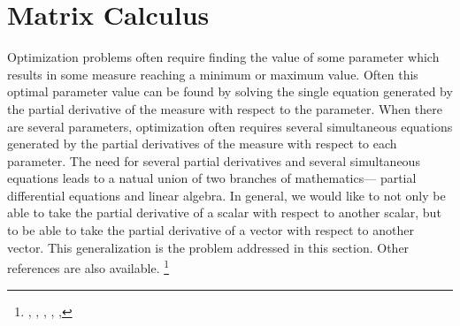 
\chapter{Matrix Calculus}
\label{app:mc}

Optimization problems often require finding the value of some parameter
which results in some measure reaching a minimum or maximum value.
Often this optimal parameter value can be found by
solving the single equation generated by the
partial derivative of the measure with respect to the parameter.
When there are several parameters,
optimization often requires several simultaneous equations
generated by the
partial derivatives of the measure with respect to each parameter.
The need for several partial derivatives and several simultaneous
equations leads to a natual union of two branches of mathematics---
partial differential equations and linear algebra.
In general, we would like to not only be able to take the partial
derivative of a scalar with respect to another scalar,
but to be able to take the partial derivative of a vector
with respect to another vector.
This generalization is the problem addressed in this section.
Other references are also available.%
\footnote{
  ,
  ,
  ,
  ,
  ,
  }

